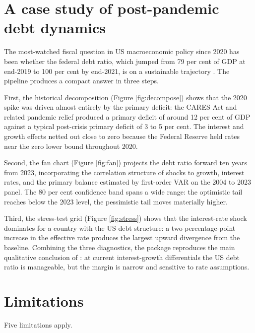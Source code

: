 \section{A case study of post-pandemic debt dynamics}\label{a-case-study-of-post-pandemic-debt-dynamics}

The most-watched fiscal question in US macroeconomic policy since
2020 has been whether the federal debt ratio, which jumped from 79
per cent of GDP at end-2019 to 100 per cent by end-2021, is on a
sustainable trajectory \citep{blanchard2022fiscal, furman2023weworry}. The  pipeline produces a
compact answer in three steps.

First, the historical decomposition (Figure \ref{fig:decompose})
shows that the 2020 spike was driven almost entirely by the
primary deficit: the CARES Act and related pandemic relief
produced a primary deficit of around 12 per cent of GDP against a
typical post-crisis primary deficit of 3 to 5 per cent. The
interest and growth effects netted out close to zero because the
Federal Reserve held rates near the zero lower bound throughout
2020.

Second, the fan chart (Figure \ref{fig:fan}) projects the debt
ratio forward ten years from 2023, incorporating the correlation
structure of shocks to growth, interest rates, and the primary
balance estimated by first-order VAR on the 2004 to 2023 panel.
The 80 per cent confidence band spans a wide range: the optimistic
tail reaches below the 2023 level, the pessimistic tail moves
materially higher.

Third, the stress-test grid (Figure \ref{fig:stress}) shows that
the interest-rate shock dominates for a country with the US debt
structure: a two percentage-point increase in the effective rate
produces the largest upward divergence from the baseline.
Combining the three diagnostics, the package reproduces the main
qualitative conclusion of \citet{blanchard2022fiscal}: at current
interest-growth differentials the US debt ratio is manageable, but
the margin is narrow and sensitive to rate assumptions.

\section{Limitations}\label{limitations}

Five limitations apply.

